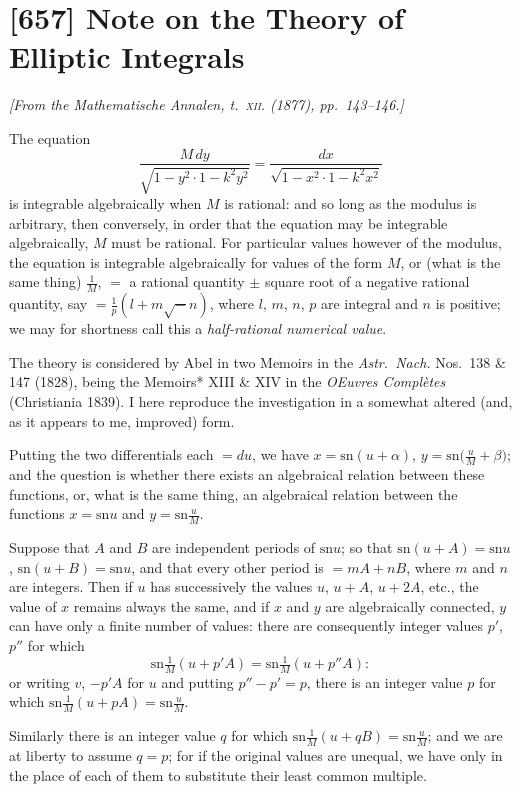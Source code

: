 \documentclass[11pt,a4paper]{book}
\providecommand{\sn}{\mathrm{sn}}
\begin{document}
\section{[657] Note on the Theory of Elliptic Integrals}
\label{sec:657}

\noindent\textit{[From the \emph{Mathematische Annalen}, t.~\textsc{xii}. (1877), pp.~143--146.]}

\medskip

The equation
\[
\frac{M\,dy}{\sqrt{1 - y^2 \cdot 1 - k^2 y^2}} = \frac{dx}{\sqrt{1 - x^2 \cdot 1 - k^2 x^2}}
\]
is integrable algebraically when $M$ is rational: and so long as the modulus is arbitrary, then conversely, in order that the equation may be integrable algebraically, $M$ must be rational. For particular values however of the modulus, the equation is integrable algebraically for values of the form $M$, or (what is the same thing) $\frac{1}{M}$, $=$ a rational quantity $\pm$ square root of a negative rational quantity, say $= \frac{1}{p}(l + m\surd -n)$, where $l$, $m$, $n$, $p$ are integral and $n$ is positive; we may for shortness call this a \emph{half-rational numerical value}.

The theory is considered by Abel in two Memoirs in the \emph{Astr.~Nach.} Nos.~138 \& 147 (1828), being the Memoirs* XIII \& XIV in the \emph{OEuvres Compl\`etes} (Christiania 1839). I here reproduce the investigation in a somewhat altered (and, as it appears to me, improved) form.

Putting the two differentials each $= du$, we have $x = \sn(u + \alpha)$, $y = \sn\bigl(\frac{u}{M} + \beta\bigr)$; and the question is whether there exists an algebraical relation between these functions, or, what is the same thing, an algebraical relation between the functions $x = \sn u$ and $y = \sn\frac{u}{M}$.

Suppose that $A$ and $B$ are independent periods of $\sn u$; so that $\sn(u + A) = \sn u$, $\sn(u + B) = \sn u$, and that every other period is $= mA + nB$, where $m$ and $n$ are integers. Then if $u$ has successively the values $u$, $u + A$, $u + 2A$, etc., the value of $x$ remains always the same, and if $x$ and $y$ are algebraically connected, $y$ can have only a finite number of values: there are consequently integer values $p'$, $p''$ for which
\[
\sn\tfrac{1}{M}(u + p'A) = \sn\tfrac{1}{M}(u + p''A):
\]
or writing $v$, $-p'A$ for $u$ and putting $p'' - p' = p$, there is an integer value $p$ for which $\sn\frac{1}{M}(u + pA) = \sn\frac{u}{M}$.

Similarly there is an integer value $q$ for which $\sn\frac{1}{M}(u + qB) = \sn\frac{u}{M}$; and we are at liberty to assume $q = p$; for if the original values are unequal, we have only in the place of each of them to substitute their least common multiple.
\end{document}
